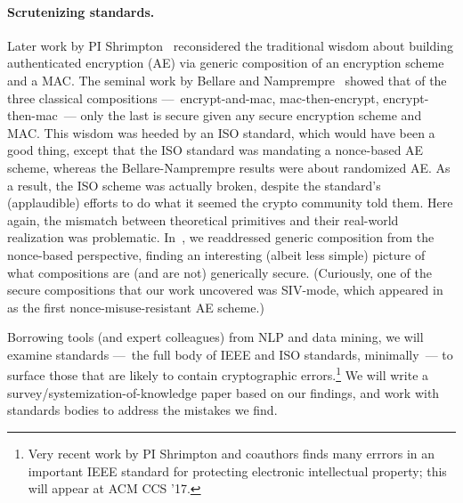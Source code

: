 \paragraph{Scrutenizing standards. }
Later work by PI Shrimpton~\cite{NRS} reconsidered the traditional wisdom about
building authenticated encryption (AE) via generic composition of an encryption
scheme and a MAC.   The seminal work by Bellare and Namprempre~\cite{BN} showed
that of the three classical compositions ---~encrypt-and-mac, mac-then-encrypt,
encrypt-then-mac~--- only the last is secure given any secure encryption scheme
and MAC.   This wisdom was heeded by an ISO standard, which would have been a
good thing, except that the ISO standard was mandating a nonce-based AE scheme,
whereas the Bellare-Namprempre results were about randomized AE.  As a result,
the ISO scheme was actually broken, despite the standard's (applaudible) efforts
to do what it seemed the crypto community told them.  Here again, the mismatch
between theoretical primitives and their real-world realization was problematic.
In~\cite{NRS}, we readdressed generic composition from the nonce-based
perspective, finding an interesting (albeit less simple) picture of what
compositions are (and are not) generically secure.  (Curiously, one of the
secure compositions that our work uncovered was SIV-mode, which
appeared in~\cite{RS06} as the first nonce-misuse-resistant AE scheme.)

\begin{task}
Borrowing tools (and expert colleagues) from NLP and data mining, we
will examine standards ---~the full body of IEEE and ISO standards,
minimally~--- to surface those that are likely to contain cryptographic
errors.\footnote{Very recent work by PI Shrimpton and coauthors finds many
errrors in an important IEEE standard for protecting electronic
intellectual property; this will appear at ACM CCS '17.}  We will
write a survey/systemization-of-knowledge paper based on our findings, and work with standards
bodies to address the mistakes we find.  
\end{task}




